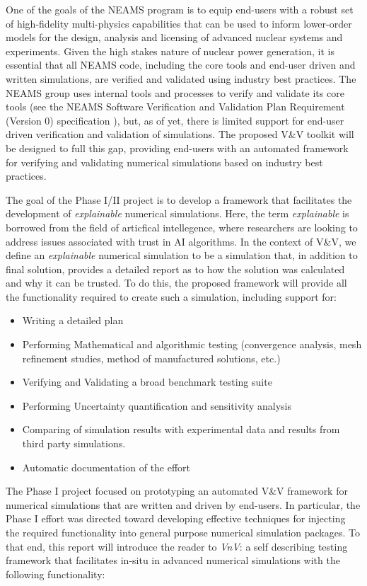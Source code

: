 One of the goals of the NEAMS program is to equip end-users with a robust set of high-fidelity multi-physics capabilities that can be used to inform lower-order models for the design, analysis and licensing of advanced nuclear systems and experiments. Given the high stakes nature of nuclear power generation, it is essential that all NEAMS code, including the core tools and end-user driven and written simulations, are verified and validated using industry best practices. The NEAMS group uses internal tools and processes to verify and validate its core tools (see the NEAMS Software Verification and Validation Plan Requirement (Version 0) specification \cite{NEAMSVV}), but, as of yet, there is limited support for end-user driven verification and validation of simulations. The proposed V\&V toolkit will be designed to full this gap, providing end-users with an automated framework for verifying and validating numerical simulations based on industry best practices.

The goal of the Phase I/II project is to develop a framework that facilitates the development of \emph{explainable} numerical simulations. Here, the term \emph{explainable} is borrowed from the field of articfical intellegence, where researchers are looking to address issues associated with trust in AI algorithms. In the context of V\&V, we define an \emph{explainable} numerical simulation to be a simulation that, in addition to final solution, provides a detailed report as to how the solution was calculated and why it can be trusted. To do this, the proposed framework will provide all the functionality required to create such a simulation, including support for:

\begin{itemize}
 \item Writing a detailed \VV plan
 \item Performing Mathematical and algorithmic testing (convergence analysis, mesh refinement studies, method of manufactured solutions, etc.)
 \item Verifying and Validating a broad benchmark testing suite
 \item Performing Uncertainty quantification and sensitivity analysis
 \item Comparing of simulation results with experimental data and results from third party simulations. 
 \item Automatic documentation of the \VV effort
\end{itemize}

The Phase I project focused on prototyping an automated V\&V framework for numerical simulations that are written and driven by end-users. In particular, the Phase I effort was directed toward developing effective techniques for injecting the required functionality into general purpose numerical simulation packages. To that end, this report will introduce the reader to \emph{VnV}: a self describing testing framework that facilitates in-situ \VV in advanced numerical simulations with the following functionality:

